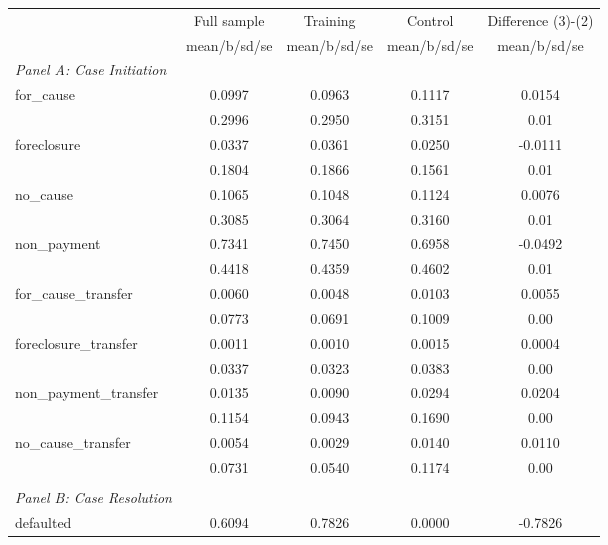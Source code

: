 {
\def\sym#1{\ifmmode^{#1}\else\(^{#1}\)\fi}
\begin{tabular}{l*{4}{c}}
\hline\hline
            &\multicolumn{1}{c}{Full sample}&\multicolumn{1}{c}{Training}&\multicolumn{1}{c}{Control}&\multicolumn{1}{c}{Difference (3)-(2)}\\
            &mean/b/sd/se&mean/b/sd/se&mean/b/sd/se&mean/b/sd/se\\
\hline
\emph{Panel A: Case Initiation}&            &            &            &            \\
for\_cause   &     0.0997 &     0.0963 &     0.1117 &      0.0154\\
            &     0.2996 &     0.2950 &     0.3151 &        0.01\\
foreclosure &     0.0337 &     0.0361 &     0.0250 &     -0.0111\\
            &     0.1804 &     0.1866 &     0.1561 &        0.01\\
no\_cause    &     0.1065 &     0.1048 &     0.1124 &      0.0076\\
            &     0.3085 &     0.3064 &     0.3160 &        0.01\\
non\_payment &     0.7341 &     0.7450 &     0.6958 &     -0.0492\\
            &     0.4418 &     0.4359 &     0.4602 &        0.01\\
for\_cause\_transfer&     0.0060 &     0.0048 &     0.0103 &      0.0055\\
            &     0.0773 &     0.0691 &     0.1009 &        0.00\\
foreclosure\_transfer&     0.0011 &     0.0010 &     0.0015 &      0.0004\\
            &     0.0337 &     0.0323 &     0.0383 &        0.00\\
non\_payment\_transfer&     0.0135 &     0.0090 &     0.0294 &      0.0204\\
            &     0.1154 &     0.0943 &     0.1690 &        0.00\\
no\_cause\_transfer&     0.0054 &     0.0029 &     0.0140 &      0.0110\\
            &     0.0731 &     0.0540 &     0.1174 &        0.00\\
\vspace{0.1em} \\ \emph{Panel B: Case Resolution}&            &            &            &            \\
defaulted   &     0.6094 &     0.7826 &     0.0000 &     -0.7826\\

\end{tabular}}
